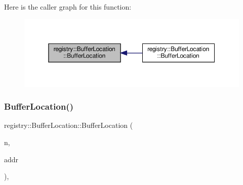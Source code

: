 Here is the caller graph for this function\+:\nopagebreak
\begin{figure}[H]
\begin{center}
\leavevmode
\includegraphics[width=350pt]{structregistry_1_1BufferLocation_a30830e0d0cfae8971273c57a894242d9_icgraph}
\end{center}
\end{figure}
\mbox{\label{structregistry_1_1BufferLocation_a7e2e78fc0a567f47a9bb01e2d3683984}} 
\subsubsection{\texorpdfstring{Buffer\+Location()}{BufferLocation()}\hspace{0.1cm}{\footnotesize\ttfamily [2/4]}}
{\footnotesize\ttfamily registry\+::\+Buffer\+Location\+::\+Buffer\+Location (\begin{DoxyParamCaption}\item[{\hyperlink{structregistry_1_1BufferLocation_ad3c2279012b74798fa1e348507020fa4}{Name\+Type}}]{n,  }\item[{\hyperlink{namespaceregistry_a2d7eac31eb792025667bcebdfe93dbf2}{Net\+Addr} const \&}]{addr }\end{DoxyParamCaption})\hspace{0.3cm}{\ttfamily [inline]}, {\ttfamily [noexcept]}}

